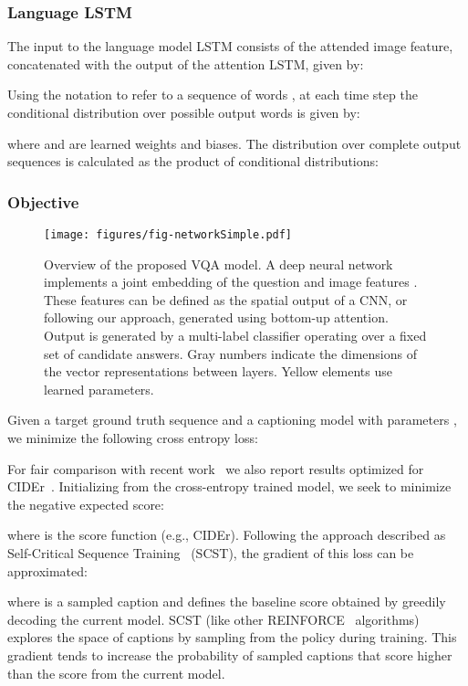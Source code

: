 \documentclass[10pt,twocolumn,letterpaper]{article}
\begin{document}
\subsubsection{Language LSTM}

The input to the language model LSTM consists of the attended image feature, concatenated with the output of the attention LSTM, given by:

Using the notation  to refer to a sequence of words , at each time step  the conditional distribution over possible output words is given by:

\noindent
where  and  are learned weights and biases. The distribution over complete output sequences is calculated as the product of conditional distributions:



\subsubsection{Objective}

\begin{figure*}
	\begin{center}
		\texttt{[image: figures/fig-networkSimple.pdf]}
	\end{center}
\caption{Overview of the proposed VQA model. A deep neural network implements a joint embedding of the question and image features  . These features can be defined as the spatial output of a CNN, or following our approach, generated using bottom-up attention. Output is generated by a multi-label classifier operating over a fixed set of candidate answers. Gray numbers indicate the dimensions of the vector representations between layers. Yellow elements use learned parameters.}
	\label{fig:vqa}
\end{figure*}

Given a target ground truth sequence  and a captioning model with parameters , we minimize the following cross entropy loss:


For fair comparison with recent work~\cite{scst2016} we also report results optimized for CIDEr~\cite{Vedantam2015}. Initializing from the cross-entropy trained model, we seek to minimize the negative expected score:

\noindent
where  is the score function (e.g., CIDEr). Following the approach described as Self-Critical Sequence Training~\cite{scst2016} (SCST), the gradient of this loss can be approximated:

\noindent where  is a sampled caption and  defines the baseline score obtained by greedily decoding the current model. SCST (like other REINFORCE~\cite{Williams:1992:SSG:139611.139614} algorithms) explores the space of captions by sampling from the policy during training. This gradient tends to increase the probability of sampled captions that score higher than the score from the current model. 
\end{document}
